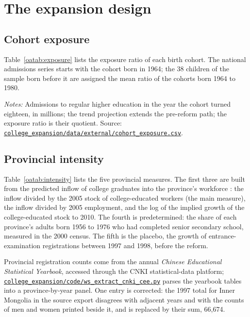 \documentclass[11pt]{article}
\numberwithin{equation}{section}
\newcommand{\repourl}{https://github.com/JiachenJin1001/family-background-earnings-china}
\newcommand{\code}[1]{\href{\repourl/blob/main/#1}{\nolinkurl{#1}}}
\begin{document}
\section{The expansion design}
\label{oa:expansion}

\subsection{Cohort exposure}

Table~\ref{oatab:exposure} lists the exposure ratio of each birth cohort. The national admissions series starts with the cohort born in 1964; the 38 children of the sample born before it are assigned the mean ratio of the cohorts born 1964 to 1980.

\begin{table}[H]
\centering
\footnotesize
\caption{National admissions and the exposure ratio by birth year.}
\label{oatab:exposure}
\setlength{\tabcolsep}{4pt}

\par\smallskip
\begin{minipage}{0.96\textwidth}
\footnotesize\emph{Notes:} Admissions to regular higher education in
the year the cohort turned eighteen, in millions; the trend projection
extends the pre-reform path; the exposure ratio is their quotient.
Source: \code{college_expansion/data/external/cohort_exposure.csv}.
\end{minipage}
\end{table}

\subsection{Provincial intensity}

Table~\ref{oatab:intensity} lists the five provincial measures. The
first three are built from the predicted inflow
of college graduates into the province's workforce \citep{Ma2024IER}:
the inflow divided by the 2005 stock of college-educated workers (the
main measure), the inflow divided by 2005 employment, and the log of
the implied growth of the college-educated stock to 2010. The fourth is predetermined:
the share of each province's adults born 1956 to 1976 who had completed
senior secondary school, measured in the 2000 census. The fifth is the
placebo, the growth of entrance-examination registrations between 1997
and 1998, before the reform.

Provincial registration counts come from the annual \emph{Chinese
Educational Statistical Yearbook}, accessed through the CNKI
statistical-data platform; \code{college_expansion/code/ws_extract_cnki_cee.py}
parses the yearbook tables into a province-by-year panel. One entry is corrected: the 1997 total for Inner Mongolia in the source export
disagrees with adjacent years and with the counts of men and women
printed beside it, and is replaced by their sum, 66,674.
\end{document}
